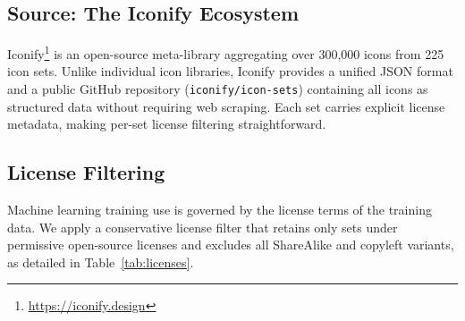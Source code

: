 
\subsection{Source: The Iconify Ecosystem}

Iconify\footnote{\url{https://iconify.design}} is an open-source meta-library
aggregating over 300,000 icons from 225 icon sets. Unlike individual icon
libraries, Iconify provides a unified JSON format and a public GitHub repository
(\texttt{iconify/icon-sets}) containing all icons as structured data without
requiring web scraping. Each set carries explicit license metadata, making
per-set license filtering straightforward.

\subsection{License Filtering}
\label{sec:license}

Machine learning training use is governed by the license terms of the training
data. We apply a conservative license filter that retains only sets under
permissive open-source licenses and excludes all ShareAlike and copyleft
variants, as detailed in Table~\ref{tab:licenses}.

